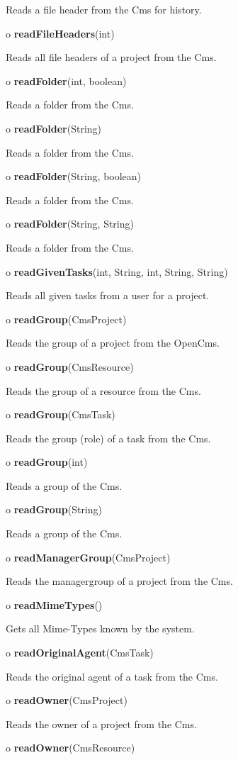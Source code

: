 \begin{description}
Reads a file header from the Cms for history.  
\item o {\bf readFileHeaders}(int)  

Reads all file headers of a project from the Cms.  
\item o {\bf readFolder}(int, boolean)  

Reads a folder from the Cms.  
\item o {\bf readFolder}(String)  

Reads a folder from the Cms.  
\item o {\bf readFolder}(String, boolean)  

Reads a folder from the Cms.  
\item o {\bf readFolder}(String, String)  

Reads a folder from the Cms.  
\item o {\bf readGivenTasks}(int, String, int, String, String)  

Reads all given tasks from a user for a project.  
\item o {\bf readGroup}(CmsProject)  

Reads the group of a project from the OpenCms.  
\item o {\bf readGroup}(CmsResource)  

Reads the group of a resource from the Cms.  
\item o {\bf readGroup}(CmsTask)  

Reads the group (role) of a task from the Cms.  
\item o {\bf readGroup}(int)  

Reads a group of the Cms.  
\item o {\bf readGroup}(String)  

Reads a group of the Cms.  
\item o {\bf readManagerGroup}(CmsProject)  

Reads the managergroup of a project from the Cms.  
\item o {\bf readMimeTypes}()  

Gets all Mime-Types known by the system.  
\item o {\bf readOriginalAgent}(CmsTask)  

Reads the original agent of a task from the Cms.  
\item o {\bf readOwner}(CmsProject)  

Reads the owner of a project from the Cms.  
\item o {\bf readOwner}(CmsResource)  


\end{description}
